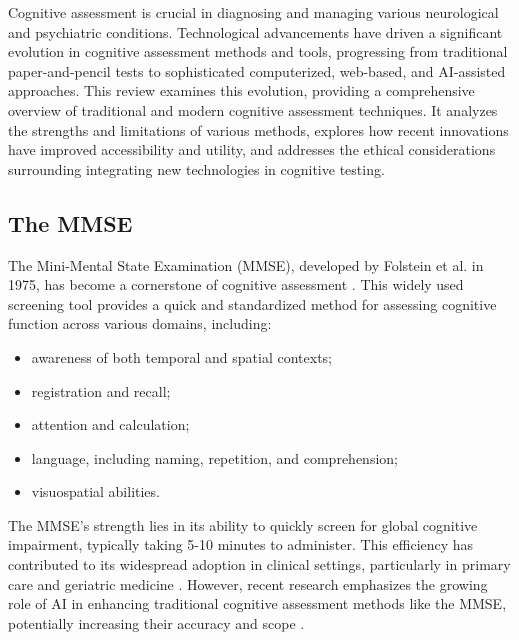 Cognitive assessment is crucial in diagnosing and managing various neurological and psychiatric conditions. Technological advancements have driven a significant evolution in cognitive assessment methods and tools, progressing from traditional paper-and-pencil tests to sophisticated computerized, web-based, and AI-assisted approaches. This review examines this evolution, providing a comprehensive overview of traditional and modern cognitive assessment techniques. It analyzes the strengths and limitations of various methods, explores how recent innovations have improved accessibility and utility, and addresses the ethical considerations surrounding integrating new technologies in cognitive testing.

\subsection{The MMSE}
The Mini-Mental State Examination (MMSE), developed by Folstein et al. in 1975, has become a cornerstone of cognitive assessment \cite{Folstein1975}. This widely used screening tool provides a quick and standardized method for assessing cognitive function across various domains, including:
\begin{itemize}
\item awareness of both temporal and spatial contexts;
\item registration and recall;
\item attention and calculation;
\item language, including naming, repetition, and comprehension;
\item visuospatial abilities.
\end{itemize}

The MMSE's strength lies in its ability to quickly screen for global cognitive impairment, typically taking 5-10 minutes to administer. This efficiency has contributed to its widespread adoption in clinical settings, particularly in primary care and geriatric medicine \cite{Crum1993}. However, recent research emphasizes the growing role of AI in enhancing traditional cognitive assessment methods like the MMSE, potentially increasing their accuracy and scope \cite{Veneziani2024}.

